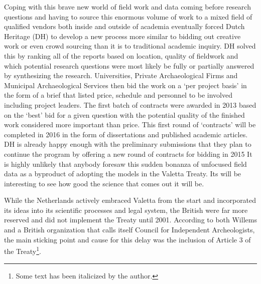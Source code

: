 Coping with this brave new world of field work and data coming before research questions and having to source this enormous volume of work to a mixed field of qualified vendors both inside and outside of academia eventually forced Dutch Heritage (DH) to develop a new process more similar to bidding out creative work or even crowd sourcing than it is to traditional academic inquiry. DH solved this by ranking all of the reports based on location, quality of fieldwork and which potential research questions were most likely be fully or partially answered by synthesizing the research. Universities, Private Archaeological Firms and Municipal Archaeological Services then bid the work on a ‘per project basis’ in the form of a brief that listed price, schedule and personnel to be involved including project leaders. The first batch of contracts were awarded in 2013 based on the ‘best’ bid for a given question with the potential quality of the finished work considered more important than price. This first round of ‘contracts’ will be completed in 2016 in the form of dissertations and published academic articles. DH is already happy enough with the preliminary submissions that they plan to continue the program by offering a new round of contracts for bidding in 2015 %
It is highly unlikely that anybody foresaw this sudden bonanza of unfocused field data as a byproduct of adopting the models in the Valetta Treaty. Its will be interesting to see how good the science that comes out it will be. 

While the Netherlands actively embraced Valetta from the start and incorporated its ideas into its scientific processes and legal system, the British were far more reserved and did not implement the Treaty until 2001. According to both Willems and a British organization that calls itself Council for Independent Archeologists, the main sticking point and cause for this delay was the inclusion of Article 3 of the Treaty\footnote{Some text has been italicized by the author.}.

